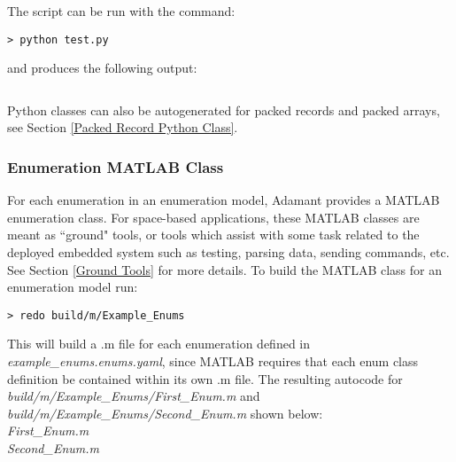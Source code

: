 The script can be run with the command:

\vspace{5mm} %
\begin{verbatim}
> python test.py
\end{verbatim}
\vspace{5mm} %

and produces the following output:

\vspace{5mm} %
\inputminted{text}{../example_architecture/enum_py/output.txt}
\vspace{5mm} %

Python classes can also be autogenerated for packed records and packed arrays, see Section \ref{Packed Record Python Class}.

\subsubsection{Enumeration MATLAB Class}

For each enumeration in an enumeration model, Adamant provides a MATLAB enumeration class. For space-based applications, these MATLAB classes are meant as ``ground" tools, or tools which assist with some task related to the deployed embedded system such as testing, parsing data, sending commands, etc. See Section \ref{Ground Tools} for more details. To build the MATLAB class for an enumeration model run:

\vspace{5mm} %
\begin{verbatim}
> redo build/m/Example_Enums
\end{verbatim}
\vspace{5mm} %

This will build a .m file for each enumeration defined in \textit{example\_enums.enums.yaml}, since MATLAB requires that each enum class definition be contained within its own .m file. The resulting autocode for \textit{build/m/Example\_Enums/First\_Enum.m} and \textit{build/m/Example\_Enums/Second\_Enum.m} shown below: \\

\textit{First\_Enum.m}
 \\

\textit{Second\_Enum.m}

